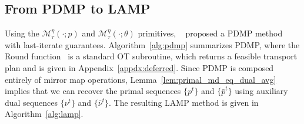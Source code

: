 \documentclass[10pt]{article}
\theoremstyle{plain}
\theoremstyle{definition}
\theoremstyle{remark}
\begin{document}
\subsection{From PDMP to LAMP}\label{ssec:algorithm}
Using the $\mathcal{M}^{\eta }_\tau(\cdot;p)$ and $\mathcal{M}^{\eta }_\tau(\cdot;\theta)$ primitives, ~\cite{liFastComputationOptimal2025} proposed a PDMP method with last-iterate guarantees. 
Algorithm~\ref{alg:pdmp} summarizes PDMP, where the Round function~\cite{altschulerNearlinearTimeApproximation2017} is a standard OT subroutine, which returns a feasible transport plan and is given in Appendix~\ref{appdx:deferred}. 
Since PDMP is composed entirely of mirror map operations, Lemma~\ref{lem:primal_md_eq_dual_avg} implies that we can recover the primal sequences $\{p^t\}$ and $\{\bar p^t\}$ using auxiliary dual sequences $\{\nu^t\}$ and $\{\bar \nu^t\}$. The resulting LAMP method is given in Algorithm~\ref{alg:lamp}.
\end{document}
